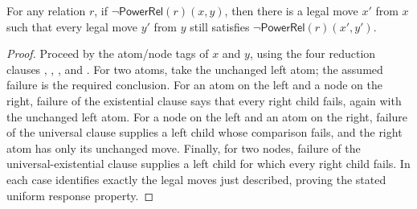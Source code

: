 \begin{lemma}
For any relation $r$, if
$\neg\mathsf{PowerRel}(r)(x,y)$, then there is a legal move $x'$ from $x$
such that every legal move $y'$ from $y$ still satisfies
$\neg\mathsf{PowerRel}(r)(x',y')$.
\end{lemma}
\begin{proof}
Proceed by the atom/node tags of $x$ and $y$, using the four reduction
clauses , ,
, and .  For two atoms,
take the unchanged left atom; the assumed failure is the required conclusion.
For an atom on the left and a node on the right, failure of the existential
clause says that every right child fails, again with the unchanged left atom.
For a node on the left and an atom on the right, failure of the universal
clause supplies a left child whose comparison fails, and the right atom has
only its unchanged move.  Finally, for two nodes, failure of the
universal-existential clause supplies a left child for which every right
child fails.  In each case  identifies exactly the legal
moves just described, proving the stated uniform response property.
\end{proof}
